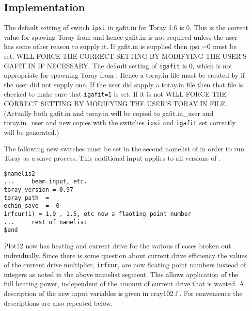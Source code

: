 \subsection{Implementation}

The default setting of switch \texttt{ipsi} in gafit.in  for Toray 1.6 is
0. This is the correct value for spawing Toray from \ot and hence
gafit.in is not required unless the user has some other reason
to supply it. If gafit.in is supplied then ipsi =0 must be set.
\ot WILL FORCE THE CORRECT SETTING BY MODIFYING THE USER'S
GAFIT.IN IF NECESSARY. The default setting of \texttt{igafit} is 0, which
is not appropriate for spawning Toray from \ot. Hence a toray.in
file must be created by \ot if the user did not supply one. If
the user did supply a toray.in file then that file is checked to
make sure that \texttt{igafit=1} is set. If it is not \ot WILL FORCE THE
CORRECT SETTING BY MODIFYING THE USER'S TORAY.IN FILE. (Actually
both gafit.in and toray.in will be copied to gafit.in\_user
and toray.in\_user and new copies with the switches \texttt{ipsi} and
\texttt{igafit} set correctly will be generated.)

The following new switches must be
set in the second namelist of \ot in order to run Toray as a
slave process. This additional input applies to all versions of
\ot.

\begin{verbatim}
$namelis2
...     beam input, etc. 
toray_version = 0.97
toray_path  =
echin_save  =  0
irfcur(i) = 1.0 , 1.5, etc now a flaoting point number
...     rest of namelist
$end
\end{verbatim}

Plot12 now has heating and current drive for the various rf cases broken out
individually. Since there is some question about current drive efficiency the
values of the current drive multiplier, \texttt{irfcur}, are now floating point
numbers instead of integers as noted in the above namelist segment. This allows
application of the full heating power, independent of the amount of current
drive that is wanted. A description of the new input variables is given in
cray102.f . For convenience the descriptions  are also repeated below.

